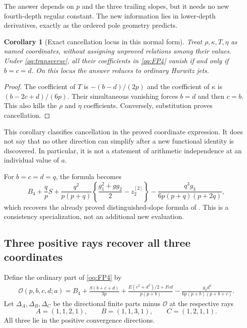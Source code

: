\documentclass[11pt,a4paper]{article}
\numberwithin{equation}{section}
\newtheorem{corollary}[theorem]{Corollary}
\theoremstyle{definition}
\theoremstyle{remark}
\begin{document}
The answer depends on $p$ and the three trailing slopes, but it needs
no new fourth-depth regular constant. The new information lies in
lower-depth derivatives, exactly as the ordered pole geometry predicts.

\begin{corollary}[Exact cancellation locus in this normal form]
\label{oq:locus}
Treat $\rho,\kappa,T,\eta$ as named coordinates, without assigning
unproved relations among their values. Under \eqref{oq:transverse},
all their coefficients in \eqref{oq:FP4} vanish if and only if
$b=c=d$. On this locus the answer reduces to ordinary Hurwitz jets.
\end{corollary}
\begin{proof}
The coefficient of $T$ is $-(b-d)/(2p)$ and the coefficient of
$\kappa$ is $(b-2c+d)/(6p)$. Their simultaneous vanishing forces
$b=d$ and then $c=b$. This also kills the $\rho$ and $\eta$
coefficients. Conversely, substitution proves cancellation.
\end{proof}

This corollary classifies cancellation in the proved coordinate expression.
It does not say that no other direction can simplify after a new functional
identity is discovered. In particular, it is not a statement of arithmetic
independence at an individual value of $a$.

For $b=c=d=q$, the formula becomes
\begin{equation}\label{oq:diagonalcheck}
 B_4+\frac qpS+
 \frac{q^2}{p(p+q)}\left\{\frac{g_1^2+gg_2}{2}-z_2^{[2]}\right\}
 -\frac{q^3g_3}{6p(p+q)(p+2q)},
\end{equation}
which recovers the already proved distinguished-slope formula of
\cite{RepoOrdered}. This is a consistency specialization, not an additional
new evaluation.

\subsection{Three positive rays recover all three coordinates}

Define the ordinary part of \eqref{oq:FP4} by
\begin{align}\label{oq:ordinary}
 \mathcal O(p,b,c,d;a)=B_4+
 \frac{S(b+c+d)}{3p}+
 \frac{E(c^2+d^2)/2+Fcd}{p(p+b)}
 -\frac{g_3d^3}{6p(p+b)(p+b+c)}.
\end{align}
Let $\Delta_A,\Delta_B,\Delta_C$ be the directional finite parts minus
$\mathcal O$ at the respective rays
\[
 A=(1,1,2,1),\qquad B=(1,1,3,1),\qquad C=(1,2,1,1).
\]
All three lie in the positive convergence directions.
\end{document}
